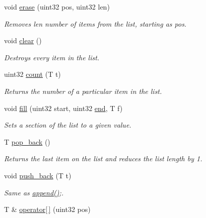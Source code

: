 \begin{DoxyCompactItemize}
\item 
void \hyperlink{classetk_1_1_list_a1e3a92350967e1fabcda37bbef21b796}{erase} (uint32 pos, uint32 len)
\begin{DoxyCompactList}\small\item\em Removes len number of items from the list, starting as pos. \end{DoxyCompactList}\item 
\hypertarget{classetk_1_1_list_a429128ca6b0d5f9e97fdfd52b0190364}{void \hyperlink{classetk_1_1_list_a429128ca6b0d5f9e97fdfd52b0190364}{clear} ()}\label{classetk_1_1_list_a429128ca6b0d5f9e97fdfd52b0190364}

\begin{DoxyCompactList}\small\item\em Destroys every item in the list. \end{DoxyCompactList}\item 
uint32 \hyperlink{classetk_1_1_list_a27f50a1845850dd0f19397e4e1bafe08}{count} (T t)
\begin{DoxyCompactList}\small\item\em Returns the number of a particular item in the list. \end{DoxyCompactList}\item 
void \hyperlink{classetk_1_1_list_aa21f417c80d9d8eeed6f33ed5c4af285}{fill} (uint32 start, uint32 \hyperlink{classetk_1_1_list_a19b25cd89872debc07cc002c18845578}{end}, T f)
\begin{DoxyCompactList}\small\item\em Sets a section of the list to a given value. \end{DoxyCompactList}\item 
T \hyperlink{classetk_1_1_list_a85741b89a92238cce95b940ce8a5554e}{pop\-\_\-back} ()
\begin{DoxyCompactList}\small\item\em Returns the last item on the list and reduces the list length by 1. \end{DoxyCompactList}\item 
\hypertarget{classetk_1_1_list_ab7dc844f7e80ac5ea9e7a8923230385a}{void \hyperlink{classetk_1_1_list_ab7dc844f7e80ac5ea9e7a8923230385a}{push\-\_\-back} (T t)}\label{classetk_1_1_list_ab7dc844f7e80ac5ea9e7a8923230385a}

\begin{DoxyCompactList}\small\item\em Same as \hyperlink{classetk_1_1_list_a45df48bc3bb87c2dd26e56f51115ab27}{append()};. \end{DoxyCompactList}\item 
\hypertarget{classetk_1_1_list_acc341d1d8b1b29b7868024777ef15b04}{T \& \hyperlink{classetk_1_1_list_acc341d1d8b1b29b7868024777ef15b04}{operator\mbox{[}$\,$\mbox{]}} (uint32 pos)}\label{classetk_1_1_list_acc341d1d8b1b29b7868024777ef15b04}


\end{DoxyCompactItemize}
